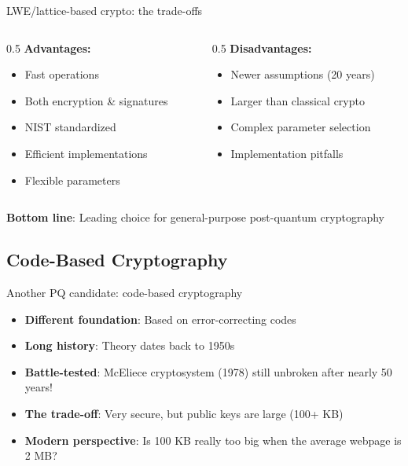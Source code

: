 \ifdefined\PRESENTATION\else\PassOptionsToClass{handout}{beamer}\fi\documentclass[aspectratio=169, lualatex]{beamer}
\begin{document}
\begin{frame}{LWE/lattice-based crypto: the trade-offs}
	\begin{columns}[c]
		\begin{column}{0.5\textwidth}
			\textbf{Advantages:}
			\begin{itemize}
				\item[\mycheckmark] Fast operations
				\item[\mycheckmark] Both encryption \& signatures
				\item[\mycheckmark] NIST standardized
				\item[\mycheckmark] Efficient implementations
				\item[\mycheckmark] Flexible parameters
			\end{itemize}
		\end{column}
		\begin{column}{0.5\textwidth}
			\textbf{Disadvantages:}
			\begin{itemize}
				\item[$\times$] Newer assumptions (20 years)
				\item[$\times$] Larger than classical crypto
				\item[$\times$] Complex parameter selection
				\item[$\times$] Implementation pitfalls
			\end{itemize}
		\end{column}
	\end{columns}
	\vspace{5mm}
	\begin{center}
		\textbf{Bottom line}: Leading choice for general-purpose post-quantum cryptography
	\end{center}
\end{frame}

\subsection{Code-Based Cryptography}

\begin{frame}{Another PQ candidate: code-based cryptography}
	\begin{itemize}
		\item \textbf{Different foundation}: Based on error-correcting codes
		\item \textbf{Long history}: Theory dates back to 1950s
		\item \textbf{Battle-tested}: McEliece cryptosystem (1978) still unbroken after nearly 50 years!
		\item \textbf{The trade-off}: Very secure, but public keys are large (100+ KB)
		\item \textbf{Modern perspective}: Is 100 KB really too big when the average webpage is 2 MB?
	\end{itemize}
\end{frame}
\end{document}
